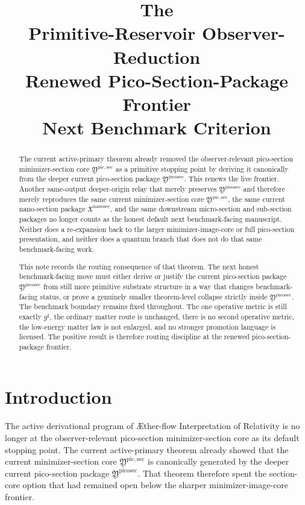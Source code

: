 \documentclass[11pt]{article}
\title{\textbf{The \TheoryName{}}\\[0.4em]
\large Primitive-Reservoir Observer-Reduction\\
\large Renewed Pico-Section-Package Frontier\\
\large Next Benchmark Criterion}
\author{}
\date{}
\newcommand{\Aflow}{\AE{}ther-flow}
\newcommand{\TheoryName}{\Aflow{} Interpretation of Relativity}
\newcommand{\CompletedMetric}{g^{\sharp}}
\newcommand{\NanoSectionPackage}{\mathfrak X^{\mathrm{nanosec}}}
\newcommand{\PicoSectionPackage}{\mathfrak Y^{\mathrm{picosec}}}
\newcommand{\PicoMinSectionCore}{\mathfrak Y^{\mathrm{pic,sec}}}
\begin{document}
\maketitle

\begin{abstract}
The current active-primary theorem already removed the observer-relevant pico-section minimizer-section core \(\PicoMinSectionCore\) as a primitive stopping point by deriving it canonically from the deeper current pico-section package \(\PicoSectionPackage\). This renews the live frontier. Another same-output deeper-origin relay that merely preserves \(\PicoSectionPackage\) and therefore merely reproduces the same current minimizer-section core \(\PicoMinSectionCore\), the same current nano-section package \(\NanoSectionPackage\), and the same downstream micro-section and sub-section packages no longer counts as the honest default next benchmark-facing manuscript. Neither does a re-expansion back to the larger minimizer-image-core or full pico-section presentation, and neither does a quantum branch that does not do that same benchmark-facing work.

This note records the routing consequence of that theorem. The next honest benchmark-facing move must either derive or justify the current pico-section package \(\PicoSectionPackage\) from still more primitive substrate structure in a way that changes benchmark-facing status, or prove a genuinely smaller theorem-level collapse strictly inside \(\PicoSectionPackage\). The benchmark boundary remains fixed throughout. The one operative metric is still exactly \(\CompletedMetric\), the ordinary matter route is unchanged, there is no second operative metric, the low-energy matter law is not enlarged, and no stronger promotion language is licensed. The positive result is therefore routing discipline at the renewed pico-section-package frontier.
\end{abstract}

\section{Introduction}

The active derivational program of \TheoryName{} is no longer at the observer-relevant pico-section minimizer-section core as its default stopping point. The current active-primary theorem already showed that the current minimizer-section core \(\PicoMinSectionCore\) is canonically generated by the deeper current pico-section package \(\PicoSectionPackage\). That theorem therefore spent the section-core option that had remained open below the sharper minimizer-image-core frontier.
\end{document}
